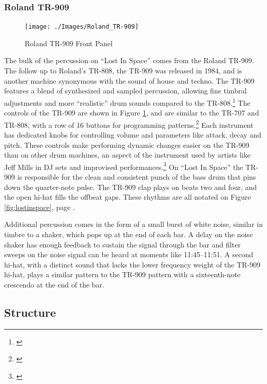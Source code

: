 \documentclass[12pt,twoside]{reedthesis}
\begin{document}
\subsubsection{Roland TR-909}

\begin{figure}
	\begin{centering}
		\texttt{[image: ./Images/Roland\_TR-909]}
		\caption{Roland TR-909 Front Panel}
		\label{fig:TR909}
	\end{centering}
\end{figure}

The bulk of the percussion on ``Lost In Space'' comes from the Roland TR-909. The follow up to Roland's TR-808, the TR-909 was released in 1984, and is another machine synonymous with the sound of house and techno. The TR-909 features a blend of synthesized and sampled percussion, allowing fine timbral adjustments and more ``realistic'' drum sounds compared to the TR-808.\footnote{\cite{annissInstrumentalInstruments9092016}} The controls of the TR-909 are shown in Figure \ref{fig:TR909}, and are similar to the TR-707 and TR-808, with a row of 16 buttons for programming patterns.\footnote{\cite{clusternoteRolandTR9092011}} Each instrument has dedicated knobs for controlling volume and parameters like attack, decay and pitch. These controls make performing dynamic changes easier on the TR-909 than on other drum machines, an aspect of the instrument used by artists like Jeff Mills in DJ sets and improvised performances.\footnote{\cite{millsJeffMillsExhibitionist}} On ``Lost In Space'' the TR-909 is responsible for the clean and consistent punch of the bass drum that pins down the quarter-note pulse. The TR-909 clap plays on beats two and four, and the open hi-hat fills the offbeat gaps. These rhythms are all notated on Figure \ref{fig:lostinspace}, page \pageref{fig:lostinspace}.

Additional percussion comes in the form of a small burst of white noise, similar in timbre to a shaker, which pops up at the end of each bar. A delay on the noise shaker has enough feedback to sustain the signal through the bar and filter sweeps on the noise signal can be heard at moments like 11:45--11:51. A second hi-hat, with a distinct sound that lacks the lower frequency weight of the TR-909 hi-hat, plays a similar pattern to the TR-909 pattern with a sixteenth-note crescendo at the end of the bar.

\subsection{Structure}
\end{document}
